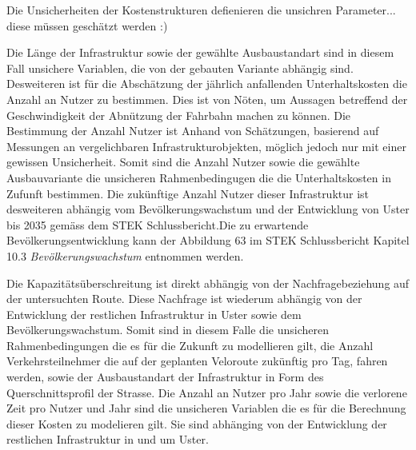 %
%
%
%

\label{subsec:Uncertain}

Die Unsicherheiten der Kostenstrukturen defienieren die unsichren Parameter... diese müssen geschätzt werden :)

Die Länge der Infrastruktur sowie der gewählte Ausbaustandart sind in diesem Fall unsichere Variablen, die von der gebauten Variante abhängig sind. Desweiteren ist für die Abschätzung der jährlich anfallenden Unterhaltskosten die Anzahl an Nutzer zu bestimmen. 
Dies ist von Nöten, um Aussagen betreffend der Geschwindigkeit der Abnützung der Fahrbahn machen zu können. 
Die Bestimmung der Anzahl Nutzer ist Anhand von Schätzungen, basierend auf Messungen an vergelichbaren Infrastrukturobjekten, möglich jedoch nur mit einer gewissen Unsicherheit. Somit sind die Anzahl Nutzer sowie die gewählte Ausbauvariante die unsicheren Rahmenbedingugen die die Unterhaltskosten in Zufunft bestimmen. 
Die zukünftige Anzahl Nutzer dieser Infrastruktur ist desweiteren abhängig vom Bevölkerungswachstum und der Entwicklung von Uster bis 2035 gemäss dem STEK Schlussbericht.Die zu erwartende Bevölkerungsentwicklung kann der Abbildung 63 im STEK Schlussbericht Kapitel 10.3 \textit{Bevölkerungswachstum} entnommen werden.


Die Kapazitätsüberschreitung ist direkt abhängig von der Nachfragebeziehung auf der untersuchten Route. Diese Nachfrage ist wiederum abhängig von der Entwicklung der restlichen Infrastruktur in Uster sowie dem Bevölkerungswachstum.
Somit sind in diesem Falle die unsicheren Rahmenbedingungen die es für die Zukunft zu modellieren gilt, die Anzahl Verkehrsteilnehmer die auf der geplanten Veloroute zukünftig pro Tag, fahren werden, sowie der Ausbaustandart der Infrastruktur in Form des Querschnittsprofil der Strasse. 
Die Anzahl an Nutzer pro Jahr sowie die verlorene Zeit pro Nutzer und Jahr sind die unsicheren Variablen die es für die Berechnung dieser Kosten zu modelieren gilt. Sie sind abhänging von der Entwicklung der restlichen Infrastruktur in und um Uster. 

